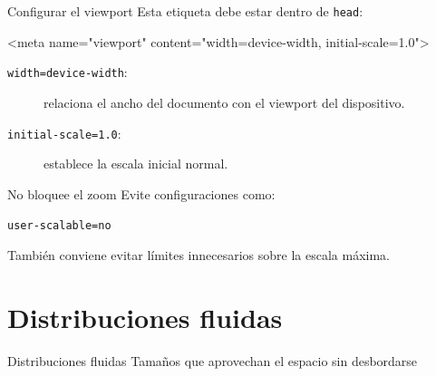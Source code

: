 \documentclass[aspectratio=169,11pt]{beamer}
\begin{document}
    \begin{frame}[fragile]{Configurar el viewport}
        Esta etiqueta debe estar dentro de \texttt{head}:

        \begin{htmlcodedark}
            <meta name="viewport"
            content="width=device-width, initial-scale=1.0">
        \end{htmlcodedark}

        \begin{description}
            \item[\texttt{width=device-width}:]
            relaciona el ancho del documento con el viewport del dispositivo.

            \item[\texttt{initial-scale=1.0}:]
            establece la escala inicial normal.
        \end{description}

    \end{frame}

    \begin{frame}{No bloquee el zoom}
        Evite configuraciones como:

        \begin{center}
            \texttt{user-scalable=no}
        \end{center}

        También conviene evitar límites innecesarios sobre la escala máxima.

    \end{frame}

    \section{Distribuciones fluidas}

    \SectionSlide
    {Distribuciones fluidas}
    {Tamaños que aprovechan el espacio sin desbordarse}
\end{document}
